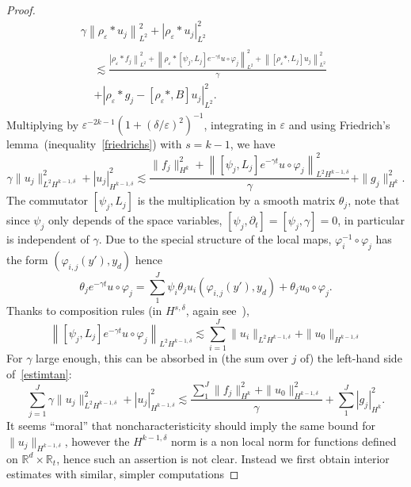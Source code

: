 \documentclass[10pt]{amsart}
\theoremstyle{definition}\newtheorem{defi}[theo]{Definition}\newtheorem{rema}[theo]{Remark}\newtheorem{exam}[theo]{Example}\newtheorem{exem}[theo]{Example}\newtheorem{nota}[theo]{Notation}
\newcommand{\R}{\mathbb{R}}
\begin{document}
\begin{proof}
\begin{multline*}
\gamma \left\|\rho_\varepsilon*u_j\right\|_{L^2}^2 +\left|\rho_\varepsilon*u_j\right|_{L^2}^2 \\
\begin{aligned}
&\lesssim
\frac{\left|\rho_\varepsilon*f_j\right\|_{L^2}^2 +\left\|\rho_\varepsilon*\left[\psi_j,L_j\right]e^{-\gamma t}u\circ\varphi_j\right\|_{L^2}^2+\left\|\left[\rho_\varepsilon*,L_j \right]u_j\right\|^2_{L^2}}{\gamma}\\
& +\left|\rho_\varepsilon*g_j-\left[\rho_\varepsilon*,B\right]u_j\right|_{L^2}^2.
\end{aligned}
\end{multline*}
Multiplying by $\varepsilon^{-2k-1}
\left(1+(\delta/\varepsilon)^2
\right)^{-1}$, integrating in $\varepsilon$ and using Friedrich's lemma~(inequality~\eqref{friedrichs}) with $s=k-1$, we have
\begin{equation}\label{estimtan}
\gamma \|u_j\|_{L^2H^{k-1,\delta}}^2+ |u_j|_{H^{k-1,\delta}}^2\lesssim
\frac{\|f_j\|_{H^k}^2+\left\|\left[\psi_j,L_j\right] e^{-\gamma t}u\circ \varphi_j\right\|_{L^2H^{k-1,\delta}}^2}{\gamma}+ \|g_j\|_{H^k}^2.
\end{equation}
The commutator $[\psi_j,L_j]$ is the multiplication by a smooth matrix $\theta_j$, note that since $\psi_j$ only depends of the space variables, $[\psi_j,\partial_t]=[\psi_j,\gamma]=0$, in particular is independent of $\gamma$. Due to the special structure of the local maps, $\varphi_i^{-1}
\circ\varphi_j$ has the form $(\varphi_{i,j}(y'),y_d)$ hence
\[
\theta_j e^{-\gamma t}u\circ \varphi_j=
\sum_1^J \psi_i\theta_ju_i(\varphi_{i,j}(y'),y_d)+\theta_ju_0\circ \varphi_j.
\]
Thanks to composition rules (in $H^{s,\delta}$, again see~\cite{ChaPi}),
\[
\left\|\left[\psi_j,L_j\right]e^{-\gamma t}u\circ \varphi_j\right\|_{L^2H^{k-1,\delta}}\lesssim \sum_{i=1}^J \|u_i\|_{L^2H^{k-1,\delta}} +\|u_0\|_{H^{k-1,\delta}}
\]
For $\gamma$ large enough, this can be absorbed in (the sum over $j$ of) the left-hand side of~\eqref{estimtan}:
\begin{equation}\label{estimtan2}
\sum_{j=1}^J\gamma \|u_j\|_{L^2H^{k-1,\delta}}^2+ |u_j|_{H^{k-1,\delta}}^2\lesssim
\frac{\sum_1^J\|f_j\|_{H^k}^2+\|u_0\|_{H^{k-1,\delta}}^2}{\gamma}+ \sum_1^J|g_j|_{H^k}^2.
\end{equation}
It seems ``moral'' that noncharacteristicity should imply the same bound for $\|u_j\|_{H^{k-1,\delta}}$, however the $H^{k-1,\delta}$ norm is a non local norm for functions defined on $\R^d\times \R_t$, hence such an assertion is not clear. Instead we first obtain interior estimates with similar, simpler computations

\end{proof}
\end{document}

